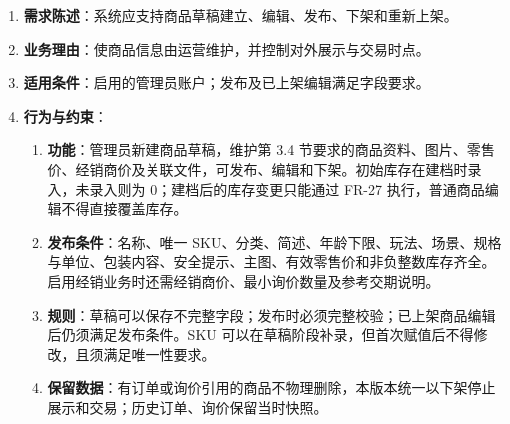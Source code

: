 \begin{enumerate}
\item {\bfseries 需求陈述}：系统应支持商品草稿建立、编辑、发布、下架和重新上架。
\item {\bfseries 业务理由}：使商品信息由运营维护，并控制对外展示与交易时点。
\item {\bfseries 适用条件}：启用的管理员账户；发布及已上架编辑满足字段要求。
\item {\bfseries 行为与约束}：
\begin{enumerate}
\item {\bfseries 功能}：管理员新建商品草稿，维护第 3.4 节要求的商品资料、图片、零售价、经销商价及关联文件，可发布、编辑和下架。初始库存在建档时录入，未录入则为 0；建档后的库存变更只能通过 FR-27 执行，普通商品编辑不得直接覆盖库存。
\item {\bfseries 发布条件}：名称、唯一 SKU、分类、简述、年龄下限、玩法、场景、规格与单位、包装内容、安全提示、主图、有效零售价和非负整数库存齐全。启用经销业务时还需经销商价、最小询价数量及参考交期说明。
\item {\bfseries 规则}：草稿可以保存不完整字段；发布时必须完整校验；已上架商品编辑后仍须满足发布条件。SKU 可以在草稿阶段补录，但首次赋值后不得修改，且须满足唯一性要求。
\item {\bfseries 保留数据}：有订单或询价引用的商品不物理删除，本版本统一以下架停止展示和交易；历史订单、询价保留当时快照。
\end{enumerate}

\end{enumerate}


